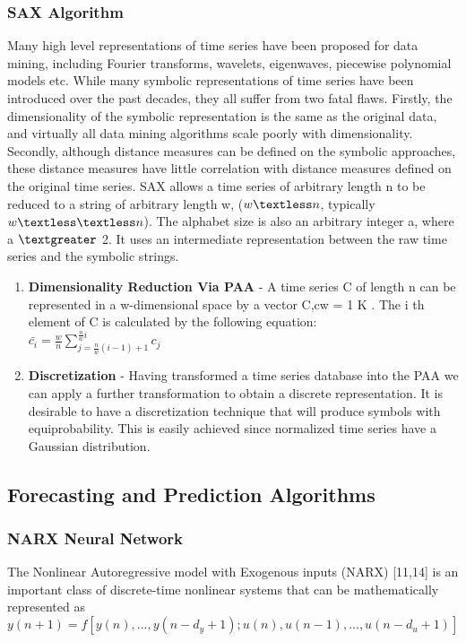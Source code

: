 \documentclass[12pt,a4paper]{report}
\begin{document}
\subsubsection{SAX Algorithm}
Many high level representations of time series have been proposed for data mining, including
Fourier transforms, wavelets, eigenwaves, piecewise polynomial models etc.
While many symbolic representations of time series have been introduced over
the past decades, they all suffer from two fatal flaws. Firstly, the dimensionality of the symbolic
representation is the same as the original data, and virtually all data mining algorithms scale poorly with
dimensionality. Secondly, although distance measures can be defined on the symbolic approaches, these
distance measures have little correlation with distance measures defined on the original time series.
SAX allows a time series of arbitrary length n to be reduced to a string of arbitrary length w, ($w \textless n$, typically
$w \textless\textless n$). The alphabet size is also an arbitrary integer a, where a $\textgreater$ 2.
It uses an intermediate representation between the raw time
series and the symbolic strings.
\begin{enumerate}
\item{\textbf{Dimensionality Reduction Via PAA} - A time series C of length n can be represented in a w-dimensional space by a vector C,cw = 1 K . The i th
element of C is calculated by the following equation:\\
$\bar{c_i} = \frac{w}{n}  \sum_{j=\frac{n}{w}(i-1) + 1}^{\frac{n}{w}i}c_j$}
\item{\textbf{Discretization} - Having transformed a time series database into the PAA we can apply a further transformation to obtain a
discrete representation. It is desirable to have a discretization technique that will produce symbols with
equiprobability. This is easily achieved since normalized time series have a Gaussian distribution.}
\end{enumerate}
\subsection{Forecasting and Prediction Algorithms}
\subsubsection{NARX Neural Network}
The Nonlinear Autoregressive model with Exogenous inputs (NARX) [11,14]
is an important class of discrete-time nonlinear systems that can be mathematically
represented as
$$y(n + 1)=f [y(n),...,y(n-d_y+1);u(n),u(n-1),...,u(n-d_u+1)] $$
\end{document}
